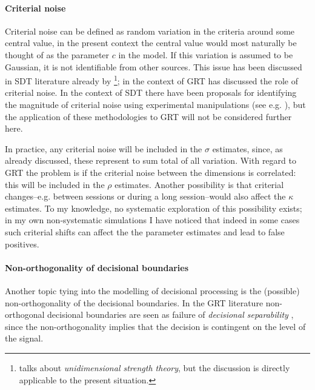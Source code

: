 \documentclass{article}\usepackage{knitr}
\begin{document}
\paragraph{Criterial noise}

Criterial noise can be defined as random variation in the criteria around some central value, in the present context the central value would most naturally be thought of as the parameter $c$ in the model. If this variation is assumed to be Gaussian, it is not identifiable from other sources. This issue has been discussed in SDT literature already by \cite{wickelgren1968}\footnote{\cite{wickelgren1968} talks about \textit{unidimensional strength theory}, but the discussion is directly applicable to the present situation.}; in the context of GRT \citet{ashby2000} has discussed the role of criterial noise. In the context of SDT there have been proposals for identifying the magnitude of criterial noise using experimental manipulations (see e.g. \citealt{kellen2012, benjamin2009, cabrera2015}), but the application of these methodologies to GRT will not be considered further here. 

In practice, any criterial noise will be included in the $\sigma$ estimates, since, as already discussed, these represent to sum total of all variation. With regard to GRT the problem is if the criterial noise between the dimensions is correlated: this will be included in the $\rho$ estimates. Another possibility is that criterial changes--e.g. between sessions or during a long session--would also affect the $\kappa$ estimates. To my knowledge, no systematic exploration of this possibility exists; in my own non-systematic simulations I have noticed that indeed in some cases such criterial shifts can affect the the parameter estimates and lead to false positives. 

\paragraph{Non-orthogonality of decisional boundaries}

Another topic tying into the modelling of decisional processing is the (possible) non-orthogonality of the decisional boundaries. In the GRT literature non-orthogonal decisional boundaries are seen as failure of \textit{decisional separability} \citep{ashby2015}, since the non-orthogonality implies that the decision is contingent on the level of the signal. 
\end{document}
